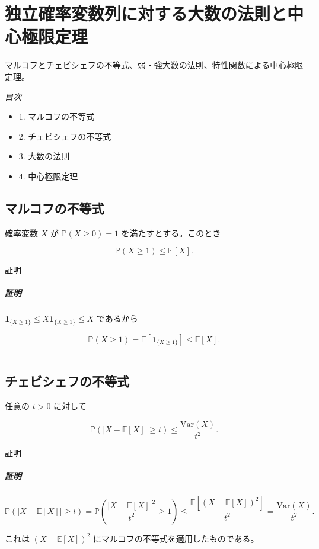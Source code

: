 \documentclass[uplatex,dvipdfmx,11pt,a4paper,openany]{bxjsbook}
\begin{document}
\chapter{独立確率変数列に対する大数の法則と中心極限定理}
マルコフとチェビシェフの不等式、弱・強大数の法則、特性関数による中心極限定理。

\emph{目次}

\begin{itemize}
\item 1. マルコフの不等式
\item 2. チェビシェフの不等式
\item 3. 大数の法則
\item 4. 中心極限定理
\end{itemize}

\section{マルコフの不等式}
確率変数 $X$ が $\mathbb P(X\ge 0)=1$ を満たすとする。このとき

\[\mathbb P(X\ge 1) \le \mathbb E[X].\]

\begin{detailblock}{証明}
\paragraph{証明}
$\mathbf 1_{\{X\ge 1\}} \le X\mathbf 1_{\{X\ge 1\}} \le X$ であるから

\[\mathbb P(X\ge 1)
                        = \mathbb E[\mathbf 1_{\{X\ge 1\}}]
                        \le \mathbb E[X].\]


\end{detailblock}

\medskip\hrule\medskip
\section{チェビシェフの不等式}
任意の $t>0$ に対して

\[\mathbb P(|X-\mathbb E[X]|\ge t) \le \frac{\mathrm{Var}(X)}{t^2}.\]

\begin{detailblock}{証明}
\paragraph{証明}
\[\mathbb P(|X-\mathbb E[X]|\ge t)
                        = \mathbb P\left(\frac{|X-\mathbb E[X]|^2}{t^2}\ge 1\right)
                        \le \frac{\mathbb E[(X-\mathbb E[X])^2]}{t^2}
                        = \frac{\mathrm{Var}(X)}{t^2}.\]

これは $(X-\mathbb E[X])^2$ にマルコフの不等式を適用したものである。


\end{detailblock}
\end{document}
